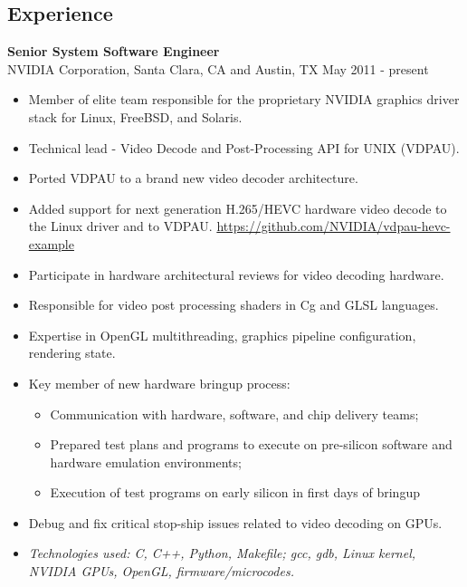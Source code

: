 \documentclass[line,margin]{res}
\begin{document}
\begin{resume}
\section{Experience}

\textbf{Senior System Software Engineer} \\
NVIDIA Corporation, Santa Clara, CA and Austin, TX \hfill May 2011 - present
\begin{itemize}  \itemsep -2pt %
\item Member of elite team responsible for the proprietary NVIDIA graphics
      driver stack for Linux, FreeBSD, and Solaris.
\item Technical lead - Video Decode and Post-Processing API for UNIX (VDPAU).
\item Ported VDPAU to a brand new video decoder architecture.
\item Added support for next generation H.265/HEVC hardware video decode to
      the Linux driver and to VDPAU.
      \url{https://github.com/NVIDIA/vdpau-hevc-example}
\item Participate in hardware architectural reviews for video decoding hardware.
\item Responsible for video post processing shaders in Cg and GLSL languages.
\item Expertise in OpenGL multithreading, graphics pipeline configuration,
      rendering state.
\item Key member of new hardware bringup process:
    \begin{itemize}  \itemsep -2pt %
    \item Communication with hardware, software, and chip delivery teams;
    \item Prepared test plans and programs to execute on pre-silicon software
          and hardware emulation environments;
    \item Execution of test programs on early silicon in first days of bringup
    \end{itemize}
\item Debug and fix critical stop-ship issues related to video decoding on GPUs.
\item \textit{Technologies used: C, C++, Python, Makefile; gcc, gdb, Linux
              kernel, NVIDIA GPUs, OpenGL, firmware/microcodes.}
\end{itemize}


\end{resume}
\end{document}
